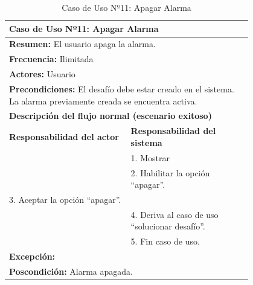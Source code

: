 \begin{table}[H]
    \centering
    \caption{Caso de Uso Nº11: Apagar Alarma}
    \vspace{10pt}
    
    \begin{tabular}{| p{0.4\linewidth} | p{0.4\linewidth} |}
        \hline
        \multicolumn{2}{|l|}{\textbf{Caso de Uso Nº11:} Apagar Alarma} \\
        \hline
        \multicolumn{2}{|l|}{\textbf{Resumen:} El usuario apaga la alarma.} \\
        \hline
        \multicolumn{2}{|l|}{\textbf{Frecuencia:} Ilimitada} \\
        \hline
        \multicolumn{2}{|l|}{\textbf{Actores:} Usuario} \\
        \hline
        \multicolumn{2}{|p{0.8\linewidth}|}{\textbf{Precondiciones:} El desafío debe estar creado en el sistema. La alarma previamente creada se encuentra activa.} \\
        \hline
        \multicolumn{2}{|l|}{\textbf{Descripción del flujo normal (escenario exitoso)} } \\
        \hline
        \textbf{Responsabilidad del actor} & \textbf{Responsabilidad del sistema} \\
        & 1. Mostrar \\
        & 2. Habilitar la opción ``apagar”. \\
        3. Aceptar la opción ``apagar”. \\
        & 4. Deriva al caso de uso ``solucionar desafío”. \\
        & 5. Fin caso de uso. \\
        \hline
        \multicolumn{2}{|l|}{\textbf{Excepción:}} \\
        \hline
        \multicolumn{2}{|l|}{\textbf{Poscondición:} Alarma apagada.} \\
        \hline
    \end{tabular}

    \label{table:11}
\end{table}

